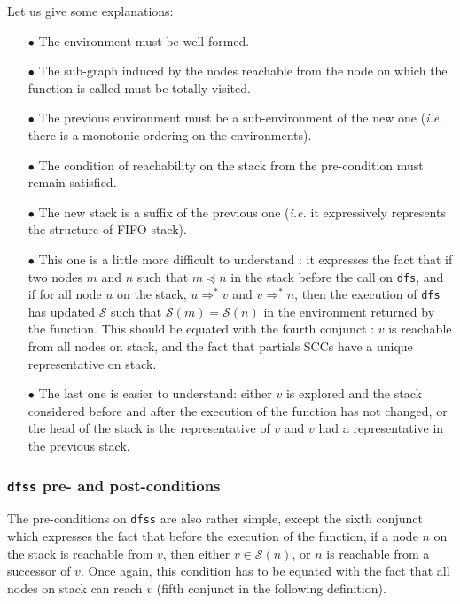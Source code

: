 \documentclass[a4 paper, 12pt]{article}
\begin{document}
{\BlankLine
\BlankLine
\BlankLine

Let us give some explanations:
\begin{itemize}
    \item[$\bullet$] The environment must be well-formed.
    \item[$\bullet$] The sub-graph induced by the nodes reachable from the node on which the function is called must be totally visited.
    \item[$\bullet$] The previous environment must be a sub-environment of the new one (\textit{i.e.} there is a monotonic ordering on the environments).
    \item[$\bullet$] The condition of reachability on the stack from the pre-condition must remain satisfied.
    \item[$\bullet$] The new stack is a suffix of the previous one (\textit{i.e.} it expressively represents the structure of FIFO stack).
    \item[$\bullet$] This one is a little more difficult to understand : it expresses the fact that if two nodes $m$ and $n$ such that $m \preceq n$ in the stack before the call on \texttt{dfs}, and if for all node $u$ on the stack, $u \Rightarrow^* v$ and $v \Rightarrow^* n$, then the execution of \texttt{dfs} has updated $\mathcal{S}$ such that $\mathcal{S}(m) = \mathcal{S}(n)$ in the environment returned by the function. This should be equated with the fourth conjunct : $v$ is reachable from all nodes on stack, and the fact that partials SCCs have a unique representative on stack.
    \item[$\bullet$] The last one is easier to understand: either $v$ is explored and the stack considered before and after the execution of the function has not changed, or the head of the stack is the representative of $v$ and $v$ had a representative in the previous stack.
\end{itemize}

\subsubsection{\texttt{dfss} pre- and post-conditions}
The pre-conditions on \texttt{dfss} are also rather simple, except the sixth conjunct which expresses the fact that before the execution of the function, if a node $n$ on the stack is reachable from $v$, then either $v \in \mathcal{S}(n)$, or $n$ is reachable from a successor of $v$. Once again, this condition has to be equated with the fact that all nodes on stack can reach $v$ (fifth conjunct in the following definition).

}
\end{document}
